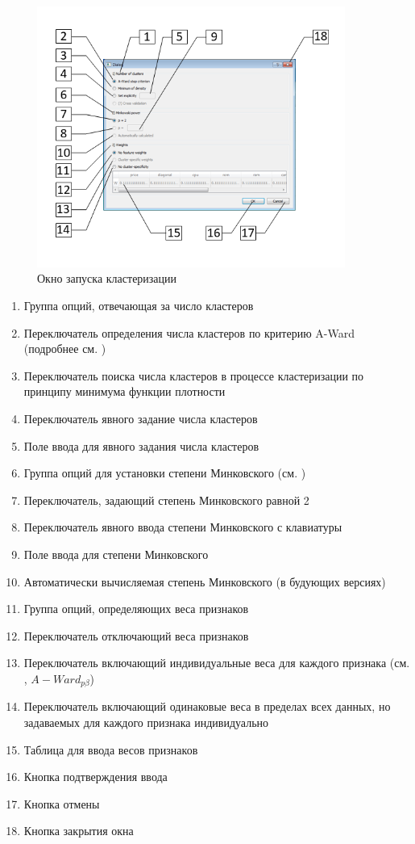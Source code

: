 \documentclass[12pt]{instruction}
\begin{document}
\begin{figure}[h!]
	\centering
	\includegraphics[width=0.9\textwidth]{img/runclusteringwindow}
	\caption{Окно запуска кластеризации}
	\label{fig:runclusteringwindow}
\end{figure}


\begin{enumerate}
	\item Группа опций, отвечающая за число кластеров
	\item Переключатель определения числа кластеров по критерию A-Ward (подробнее см. \cite{mirkin_formula_8})
	\item Переключатель поиска числа кластеров в процессе кластеризации по принципу минимума функции плотности \cite{kovaleva}
	\item Переключатель явного задание числа кластеров 
	\item Поле ввода для явного задания числа кластеров 
	\item Группа опций для установки степени Минковского (см. \cite{amorim})
	\item Переключатель, задающий степень Минковского равной 2
	\item Переключатель явного ввода степени Минковского с клавиатуры
	\item Поле ввода для степени Минковского
	\item Автоматически вычисляемая степень Минковского (в будующих версиях)
	\item Группа опций, определяющих веса признаков
	\item Переключатель отключающий веса признаков
	\item Переключатель включающий индивидуальные веса для каждого признака (см. \cite{amorim}, $A-Ward_{p\beta}$)
	\item Переключатель включающий одинаковые веса в пределах всех данных, но задаваемых для каждого признака индивидуально 
	\item Таблица для ввода весов признаков
	\item Кнопка подтверждения ввода
	\item Кнопка отмены
	\item Кнопка закрытия окна
\end{enumerate}
\end{document}
